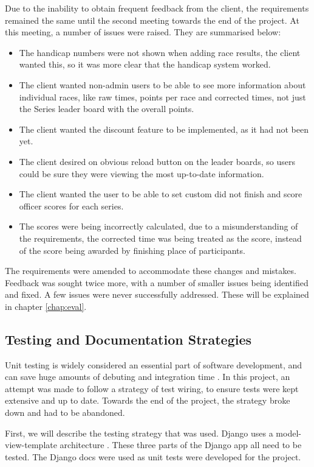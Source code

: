 \documentclass{l4proj}
\begin{document}
Due to the inability to obtain frequent feedback from the client, the requirements remained the same until the second meeting towards the end of the project. At this meeting, a number of issues were raised. They are summarised below:
\begin{itemize}
    \item 
    The handicap numbers were not shown when adding race results, the client wanted this, so it was more clear that the handicap system worked.
    \item
    The client wanted non-admin users to be able to see more information about individual races, like raw times, points per race and corrected times, not just the Series leader board with the overall points.
    \item
    The client wanted the discount feature to be implemented, as it had not been yet.
    \item
    The client desired on obvious reload button on the leader boards, so users could be sure they were viewing the most up-to-date information.
    \item
    The client wanted the user to be able to set custom did not finish and score officer scores for each series.
    \item
    The scores were being incorrectly calculated, due to a misunderstanding of the requirements, the corrected time was being treated as the score, instead of the score being awarded by finishing place of participants.
\end{itemize}

The requirements were amended to accommodate these changes and mistakes. Feedback was sought twice more, with a number of smaller issues being identified and fixed. A few issues were never successfully addressed. These will be explained in chapter \ref{chap:eval}.


\subsection{Testing and Documentation Strategies}

Unit testing is widely considered an essential part of software development, and can save huge amounts of debuting and integration time \citep{unittest}. In this project, an attempt was made to follow a strategy of test wiring, to ensure tests were kept extensive and up to date. Towards the end of the project, the strategy broke down and had to be abandoned.

First, we will describe the testing strategy that was used. Django uses a model-view-template architecture \citep{django}. These three parts of the Django app all need to be tested. The Django docs \citep{django} were used as unit tests were developed for the project.
\end{document}
